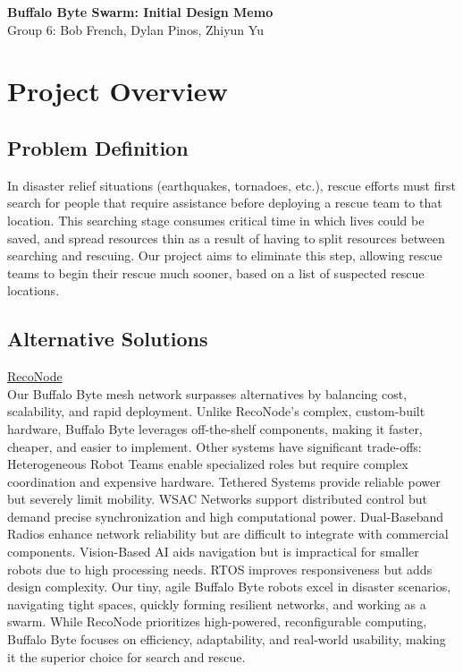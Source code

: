 \documentclass[10pt]{article}
\begin{document}
\begin{center}
	\Large\textbf{Buffalo Byte Swarm: Initial Design Memo}\\[0.1in]
	\large Group 6: Bob French, Dylan Pinos, Zhiyun Yu
\end{center}

\section*{Project Overview}
\subsection*{Problem Definition}
In disaster relief situations (earthquakes, tornadoes, etc.), rescue efforts must first search for people that require assistance before deploying a rescue team to that location. This searching stage consumes critical time in which lives could be saved, and spread resources thin as a result of having to split resources between searching and rescuing. Our project aims to eliminate this step, allowing rescue teams to begin their rescue much sooner, based on a list of suspected rescue locations.
\subsection*{Alternative Solutions}
\underline{RecoNode}\\[0.5\baselineskip]
Our Buffalo Byte mesh network surpasses alternatives by balancing cost, scalability, and rapid deployment. Unlike RecoNode’s complex, custom-built hardware, Buffalo Byte leverages off-the-shelf components, making it faster, cheaper, and easier to implement. Other systems have significant trade-offs: Heterogeneous Robot Teams enable specialized roles but require complex coordination and expensive hardware. Tethered Systems provide reliable power but severely limit mobility. WSAC Networks support distributed control but demand precise synchronization and high computational power. Dual-Baseband Radios enhance network reliability but are difficult to integrate with commercial components. Vision-Based AI aids navigation but is impractical for smaller robots due to high processing needs. RTOS improves responsiveness but adds design complexity. Our tiny, agile Buffalo Byte robots excel in disaster scenarios, navigating tight spaces, quickly forming resilient networks, and working as a swarm. While RecoNode prioritizes high-powered, reconfigurable computing, Buffalo Byte focuses on efficiency, adaptability, and real-world usability, making it the superior choice for search and rescue.
\end{document}
